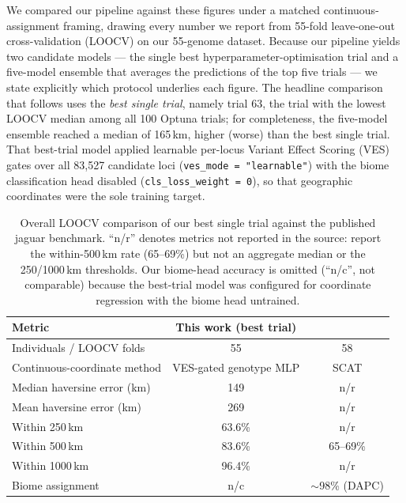 \documentclass[twocolumn,10pt]{article}
\begin{document}
We compared our pipeline against these figures under a matched continuous-assignment framing,
drawing every number we report from 55-fold leave-one-out cross-validation (LOOCV) on our 55-genome
dataset. Because our pipeline yields two candidate models --- the single best
hyperparameter-optimisation trial and a five-model ensemble that averages the predictions of the top
five trials --- we state explicitly which protocol underlies each figure. The headline comparison
that follows uses the \emph{best single trial}, namely trial 63, the trial with the lowest LOOCV
median among all 100 Optuna trials; for completeness, the five-model ensemble reached a median of
165\,km, higher (worse) than the best single trial. That best-trial model applied learnable
per-locus Variant Effect Scoring (VES) gates over all 83{,}527 candidate loci
(\texttt{ves\_mode\,=\,"learnable"}) with the biome classification head disabled
(\texttt{cls\_loss\_weight\,=\,0}), so that geographic coordinates were the sole training target.

\begin{table}[t]
\centering
\caption{Overall LOOCV comparison of our best single trial against the published jaguar benchmark.
``n/r'' denotes metrics not reported in the source: \citet{lazzari2025development} report the
within-500\,km rate (65--69\%) but not an aggregate median or the 250/1000\,km thresholds. Our
biome-head accuracy is omitted (``n/c'', not comparable) because the best-trial model was configured
for coordinate regression with the biome head untrained.}
\label{tab:lazzari-overall}
\begin{tabular}{lcc}
\toprule
Metric & This work (best trial) & \citet{lazzari2025development} \\
\midrule
Individuals / LOOCV folds & 55 & 58 \\
Continuous-coordinate method & VES-gated genotype MLP & SCAT \\
Median haversine error (km) & 149 & n/r \\
Mean haversine error (km) & 269 & n/r \\
Within 250\,km & 63.6\% & n/r \\
Within 500\,km & 83.6\% & 65--69\% \\
Within 1000\,km & 96.4\% & n/r \\
Biome assignment & n/c & $\sim$98\% (DAPC) \\
\bottomrule
\end{tabular}
\end{table}
\end{document}

